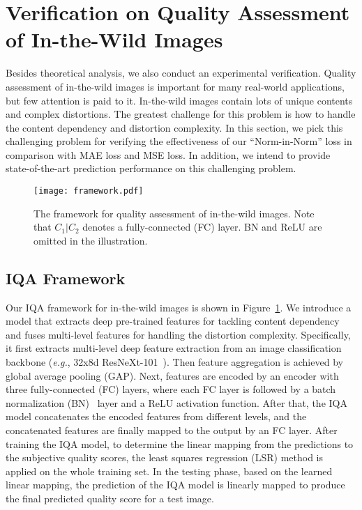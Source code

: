 \documentclass[sigconf]{acmart}
\begin{document}
\section{Verification on Quality Assessment of In-the-Wild Images}
\label{sec:verification}
Besides theoretical analysis, we also conduct an experimental verification.
Quality assessment of in-the-wild images is important for many real-world applications, but few attention is paid to it.
In-the-wild images contain lots of unique contents and complex distortions.
The greatest challenge for this problem is how to handle the content dependency and distortion complexity.
In this section, we pick this challenging problem for verifying the effectiveness of our ``Norm-in-Norm'' loss in comparison with MAE loss and MSE loss. 
In addition, we intend to provide state-of-the-art prediction performance on this challenging problem.

\begin{figure}[!t]
    \centering
    \texttt{[image: framework.pdf]}
    \caption{The framework for quality assessment of in-the-wild images. Note that $C_1 |C_2$ denotes a fully-connected (FC) layer. BN and ReLU are omitted in the illustration.}
    \label{fig:framework}
\end{figure}

\subsection{IQA Framework}
\label{sec:framework}

Our IQA framework for in-the-wild images is shown in Figure~\ref{fig:framework}.
We introduce a model that extracts deep pre-trained features for tackling content dependency and fuses multi-level features for handling the distortion complexity. 
Specifically, it first extracts multi-level deep feature extraction from an image classification backbone (\textit{e.g.}, 32x8d ResNeXt-101~\cite{xie2017aggregated}).
Then feature aggregation is achieved by global average pooling (GAP).
Next, features are encoded by an encoder with three fully-connected (FC) layers, where each FC layer is followed by a batch normalization (BN)~\cite{ioffe2015batch} layer and a ReLU activation function. 
After that, the IQA model concatenates the encoded features from different levels, and the concatenated features are finally mapped to the output by an FC layer. 
After training the IQA model, to determine the linear mapping from the predictions to the subjective quality scores, the least squares regression (LSR) method is applied on the whole training set. 
In the testing phase, based on the learned linear mapping, the prediction of the IQA model is linearly mapped to produce the final predicted quality score for a test image.
\end{document}
